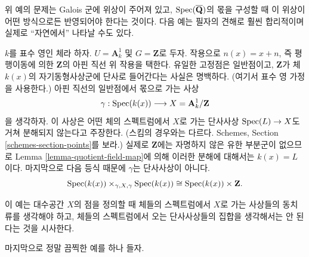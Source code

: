 \noindent
위 예의 문제는 Galois 군에 위상이 주어져 있고,
$\mathop{\mathrm{Spec}}(\overline{\mathbf{Q}})$의 몫을 구성할 때 이 위상이 어떤
방식으로든 반영되어야 한다는 것이다. 다음 예는 필자의 견해로 훨씬
합리적이며 실제로 ``자연에서'' 나타날 수도 있다.

\begin{example}
\label{example-affine-line-translation}
$k$를 표수 영인 체라 하자.
$U = \mathbf{A}^1_k$ 및 $G = \mathbf{Z}$로 두자.
작용으로 $n(x) = x + n$, 즉 평행이동에 의한
$\mathbf{Z}$의 아핀 직선 위 작용을 택한다.
유일한 고정점은 일반점이고, $\mathbf{Z}$가 체 $k(x)$의
자기동형사상군에 단사로 들어간다는 사실은 명백하다.
(여기서 표수 영 가정을 사용한다.) 아핀 직선의 일반점에서 몫으로 가는
사상
$$
\gamma : \mathop{\mathrm{Spec}}(k(x)) \longrightarrow X = \mathbf{A}^1_k/\mathbf{Z}
$$
을 생각하자. 이 사상은 어떤 체의 스펙트럼에서 $X$로 가는 단사사상
$\mathop{\mathrm{Spec}}(L) \to X$도 거쳐 분해되지 않는다고 주장한다.
(스킴의 경우와는 다르다. Schemes, Section
\ref{schemes-section-points}를 보라.) 실제로 $\mathbf{Z}$에는
자명하지 않은 유한 부분군이 없으므로 Lemma
\ref{lemma-quotient-field-map}에 의해 이러한 분해에 대해서는
$k(x) = L$이다. 마지막으로 다음 등식 때문에 $\gamma$는
단사사상이 아니다.
$$
\mathop{\mathrm{Spec}}(k(x)) \times_{\gamma, X, \gamma} \mathop{\mathrm{Spec}}(k(x))
\cong
\mathop{\mathrm{Spec}}(k(x)) \times \mathbf{Z}.
$$
\end{example}

\noindent
이 예는 대수공간 $X$의 점을 정의할 때 체들의 스펙트럼에서 $X$로
가는 사상들의 동치류를 생각해야 하고, 체들의 스펙트럼에서 오는
단사사상들의 집합을 생각해서는 안 된다는 것을 시사한다.

\medskip\noindent
마지막으로 정말 끔찍한 예를 하나 들자.

